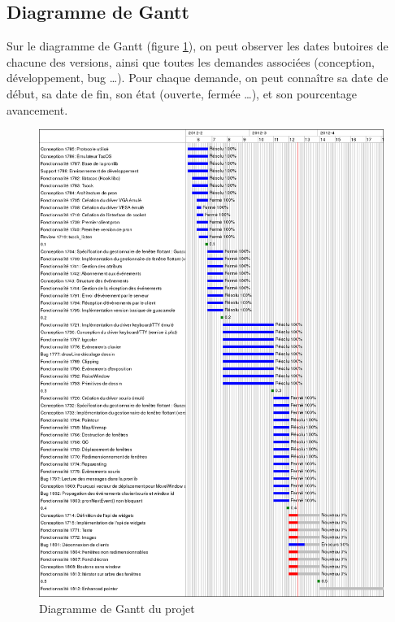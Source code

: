 \subsection{Diagramme de Gantt}
Sur le diagramme de Gantt (figure \ref{fig:diagGant}), on peut observer les dates butoires de chacune des versions, ainsi que toutes les demandes associées (conception, développement, bug \ldots). Pour chaque demande, on peut connaître sa date de début, sa date de fin, son état (ouverte, fermée \ldots), et son pourcentage avancement.
\begin{figure}[H!]
  \centering
    \includegraphics[width=15cm]{figures/tacos-gui-gantt}
  \caption{\label{fig:diagGant}Diagramme de Gantt du projet}
\end{figure}

